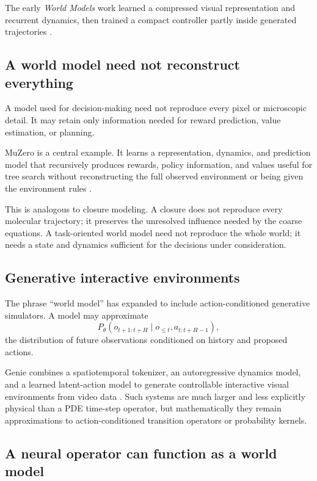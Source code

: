\documentclass[11pt]{article}
\begin{document}
The early \emph{World Models} work learned a compressed visual representation and recurrent dynamics, then trained a compact controller partly inside generated trajectories \citep{ha2018worldmodels}.

\subsection{A world model need not reconstruct everything}

A model used for decision-making need not reproduce every pixel or microscopic detail. It may retain only information needed for reward prediction, value estimation, or planning.

MuZero is a central example. It learns a representation, dynamics, and prediction model that recursively produces rewards, policy information, and values useful for tree search without reconstructing the full observed environment or being given the environment rules \citep{schrittwieser2020muzero}.

This is analogous to closure modeling. A closure does not reproduce every molecular trajectory; it preserves the unresolved influence needed by the coarse equations. A task-oriented world model need not reproduce the whole world; it needs a state and dynamics sufficient for the decisions under consideration.

\subsection{Generative interactive environments}

The phrase ``world model'' has expanded to include action-conditioned generative simulators. A model may approximate
\begin{equation}
 P_\theta
 \left(
 o_{t+1:t+H}
 \mid
 o_{\le t},a_{t:t+H-1}
 \right),
\end{equation}
the distribution of future observations conditioned on history and proposed actions.

Genie combines a spatiotemporal tokenizer, an autoregressive dynamics model, and a learned latent-action model to generate controllable interactive visual environments from video data \citep{bruce2024genie}. Such systems are much larger and less explicitly physical than a PDE time-step operator, but mathematically they remain approximations to action-conditioned transition operators or probability kernels.

\subsection{A neural operator can function as a world model}
\end{document}
